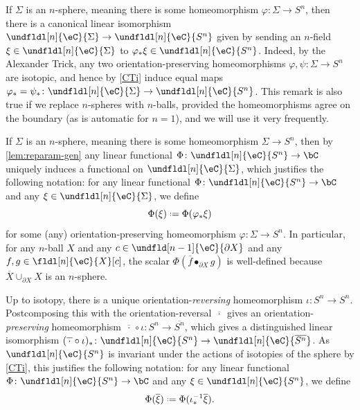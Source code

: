\documentclass[12pt,reqno]{amsart}
\newcommand{\psn}{\Phi}
\newcommand{\C}{\eC}
\newcommand{\blt}{\bullet}
\newcommand{\fcj}[1]{\overline{#1}}
\newcommand{\orev}{\overline}
\DeclareRobustCommand{\coloneq}{\mathrel{\vcenter{\baselineskip0.5ex\lineskiplimit0pt\hbox{\scriptsize{\upshape.}}\hbox{\scriptsize{\upshape.}}}}=}
\begin{document}
\begin{remark}
\label{lem:reparam-gen}
If $\Sigma$ is an $n$-sphere, meaning there is some homeomorphism $\varphi\colon \Sigma\to S^n$, then there is a canonical linear isomorphism
$\undfldl[n]{\C}{\Sigma}\to\undfldl[n]{\C}{S^n}$ given by sending an $n$-field $\xi\in\undfldl[n]{\C}{\Sigma}$ to $\varphi_*\xi\in\undfldl[n]{\C}{S^n}$. Indeed, by the Alexander Trick, any two orientation-preserving homeomorphisms $\varphi,\psi\colon \Sigma\to S^n$ are isotopic, and hence by \ref{CTi} induce equal maps $\varphi_*=\psi_*\colon\undfldl[n]{\C}{\Sigma}\to\undfldl[n]{\C}{S^n}$. This remark is also true if we replace $n$-spheres with $n$-balls, provided the homeomorphisms agree on the boundary (as is automatic for $n=1$), and we will use it very frequently.
\end{remark}

\begin{notation}
\label{rmk:sphere-functional-evaluation}
If $\Sigma$ is an $n$-sphere, meaning there is some homeomorphism $\Sigma\to S^n$, then by \cref{lem:reparam-gen} any linear functional $\psn \colon \undfldl[n]{\C}{S^n} \to \bC$ uniquely induces a functional on $\undfldl[n]{\C}{\Sigma}$, which justifies the following notation: for any linear functional $\psn\colon\undfldl[n]{\C}{S^n}\to\bC$ and any $\xi\in\undfldl[n]{\C}{\Sigma}$, we define
\[
\psn(\xi) \coloneq \psn(\varphi_*\xi)
\]
for some (any) orientation-preserving homeomorphism $\varphi\colon\Sigma\to S^n$. In particular, for any $n$-ball $X$ and any $c\in\undfld[n-1]{\C}{\partial X}$ and any $f,g \in \fldl[n]{\C}{X}[c]$, the scalar $\psn(\fcj{f}\blt_{\partial X} g)$ is well-defined because $\orev{X} \cup_{\partial X} X$ is an $n$-sphere.
\end{notation}

\begin{notation}
\label{reflection and functionals}
Up to isotopy, there is a unique orientation-\emph{reversing} homeomorphism $\iota\colon S^n\to S^n$. Postcomposing this with the orientation-reversal $\orev{\,\cdot\,}$ gives an orientation-\emph{preserving} homeomorphism $\orev{\,\cdot\,}\circ\iota\colon S^n\to \orev{S^n}$, which gives a distinguished linear isomorphism $(\fcj{\,\cdot\,}\circ \iota)_*\colon\undfldl[n]{\C}{S^n}\to\undfldl[n]{\C}{\orev{S^n}}$. As $\undfldl[n]{\C}{S^n}$ is invariant under the actions of isotopies of the sphere by \ref{CTi}, this justifies the following notation: for any linear functional $\psn\colon\undfldl[n]{\C}{S^n}\to\bC$ and any $\xi\in \undfldl[n]{\C}{S^n}$, we define
\[
\Phi(\fcj\xi)\coloneq \Phi(\iota_*^{-1}\fcj\xi).
\]
\end{notation}
\end{document}
